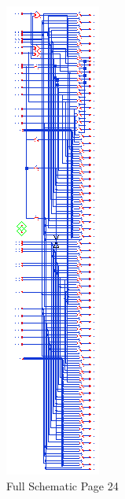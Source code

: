 \documentclass[11pt]{article}
\begin{document}
		
		\begin{figure}[H] 
			\centering 
			\includegraphics[width=\textwidth,height=\dimexpr\textheight-4\baselineskip-\abovecaptionskip-\belowcaptionskip\relax,keepaspectratio]{"Pictures/Full Schematic Page 24"}
			\caption{Full Schematic Page 24} 
			\label{fig:Full-Schematic-Page-24} 
		\end{figure}
		
\end{document}
